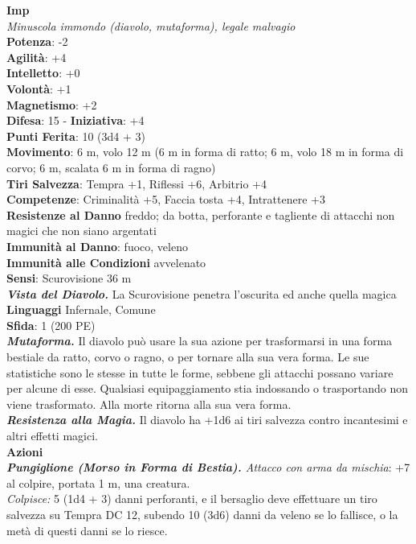 \begin{multicols}{2}
\medskip\textbf{Imp}\\
\emph{Minuscola immondo (diavolo, mutaforma), legale malvagio}\\
\textbf{Potenza}: -2\\
\textbf{Agilità}: +4\\
\textbf{Intelletto}: +0\\
\textbf{Volontà}: +1\\
\textbf{Magnetismo}: +2\\
\textbf{Difesa}: 15 - \textbf{Iniziativa}: +4\\
\textbf{Punti Ferita}: 10 (3d4 + 3)\\
\textbf{Movimento}: 6 m, volo 12 m (6 m in forma di ratto; 6 m, volo 18 m in forma di corvo; 6 m, scalata 6 m in forma di ragno)\\
\textbf{Tiri Salvezza}: Tempra +1, Riflessi +6, Arbitrio +4\\
\textbf{Competenze}: Criminalità +5, Faccia tosta +4, Intrattenere +3\\
\textbf{Resistenze al Danno} freddo; da botta, perforante e tagliente di attacchi non magici che non siano argentati\\
\textbf{Immunità al Danno}: fuoco, veleno\\
\textbf{Immunità alle Condizioni} avvelenato\\
\textbf{Sensi}: Scurovisione 36 m\\
\emph{\textbf{Vista del Diavolo.}} La Scurovisione penetra l'oscurita ed anche quella magica\\
\textbf{Linguaggi} Infernale, Comune\\
\textbf{Sfida}: 1 (200 PE)\smallskip\\
\emph{\textbf{Mutaforma.}} Il diavolo può usare la sua azione per trasformarsi in una forma bestiale da ratto, corvo o ragno, o per tornare alla sua vera forma. Le sue statistiche sono le stesse in tutte le forme, sebbene gli attacchi possano variare per alcune di esse. Qualsiasi equipaggiamento stia indossando o trasportando non viene trasformato. Alla morte ritorna alla sua vera forma. \\
\emph{\textbf{Resistenza alla Magia.}} Il diavolo ha +1d6 ai tiri salvezza contro incantesimi e altri effetti magici.\\
\smallskip\textbf{Azioni}\\
\emph{\textbf{Pungiglione (Morso in Forma di Bestia).} Attacco con arma da mischia}: +7 al colpire, portata 1 m, una creatura.\\
\emph{Colpisce:} 5 (1d4 + 3) danni perforanti, e il bersaglio deve effettuare un tiro salvezza su Tempra DC  12, subendo 10 (3d6) danni da veleno se lo fallisce, o la metà di questi danni se lo riesce.\\

\end{multicols}
